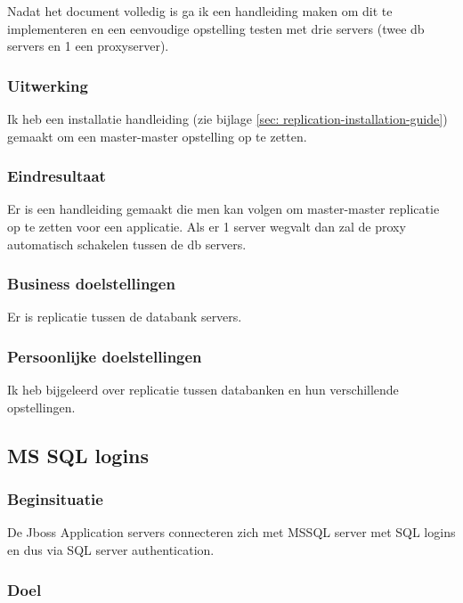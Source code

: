 Nadat het document volledig is ga ik een handleiding maken om dit te implementeren en een eenvoudige opstelling testen met drie servers (twee \gls{db} servers en 1 een proxyserver).

\subsubsection{Uitwerking}

Ik heb een installatie handleiding (zie bijlage \ref{sec: replication-installation-guide}) gemaakt om een master-master opstelling op te zetten.

\subsubsection{Eindresultaat}

Er is een handleiding gemaakt die men kan volgen om master-master replicatie op te zetten voor een applicatie. Als er 1 server wegvalt dan zal de proxy automatisch schakelen tussen de \gls{db} servers.

\subsubsection{Business doelstellingen}

Er is replicatie tussen de databank servers.

\subsubsection{Persoonlijke doelstellingen}

Ik heb bijgeleerd over replicatie tussen databanken en hun verschillende opstellingen.


\subsection{MS SQL logins}

\subsubsection{Beginsituatie}

De Jboss Application servers connecteren zich met MSSQL server met SQL logins en dus via SQL server authentication.

\subsubsection{Doel}

